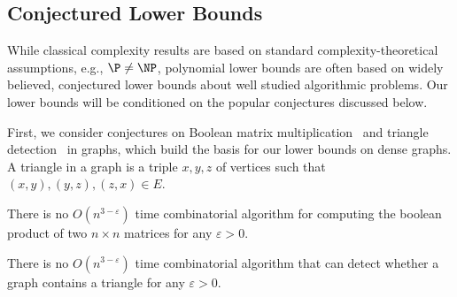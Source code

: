 \documentclass[11pt,letterpaper]{article}
\newcommand{\lu}{\textup{(}}
\newcommand{\ru}{\textup{)}\xspace}
\newcommand{\upbr}[1]{\lu #1\ru}
\newcommand{\target}{T\xspace}
\newif\iffullversion
\newcommand{\infull}[1]{\iffullversion #1\fi}
\begin{document}
\infull{
\begin{observation}\label{obs:ConjBuchiStreet}
	Conjunctive Büchi \upbr{resp.\ coBüchi} objectives are special instances of Streett objectives.
\end{observation}
\begin{proof}
	For Büchi let $L_i = V$ and $U_i = \target_i$, for coBüchi let $L_i = \target_i$
	and $U_i = \emptyset$.
\end{proof}

\begin{observation}\label{obs:DisjBuchiRabin}
	Disjunctive Büchi \upbr{resp.\ coBüchi} objectives are special instances of Rabin objectives.
\end{observation}
\begin{proof}
	For Büchi let $L_i = \target_i$ and $U_i = \emptyset$, for coBüchi let 
	$L_i = V$ and $U_i = \target_i$.
\end{proof}
}

\subsection{Conjectured Lower Bounds}\label{sec:conjectures}

While classical complexity results are based on standard complexity-theoretical assumptions,
e.g., $\P \ne \NP$, polynomial lower bounds are often based on widely believed,
conjectured lower bounds 
about well studied algorithmic problems.
Our lower bounds will be conditioned on the popular conjectures discussed below.

First, we consider conjectures on Boolean matrix multiplication~\cite{WilliamsW10,AbboudW14} and 
triangle detection~\cite{AbboudW14} in graphs, which build the basis for our lower bounds on dense graphs. A triangle in a graph is a triple $x, y, z$ of vertices 
such that $(x, y), (y, z), (z, x) \in E$.

\begin{conjecture}\label{conj:bmm}
There is no $O(n^{3 - \varepsilon})$ time combinatorial algorithm for computing the boolean product of 
two $n \times n$ matrices for any $\varepsilon > 0$.
\end{conjecture}

\begin{conjecture}\label{conj:triangle}
There is \infull{no $O(\min\{n^{\omega - \varepsilon},$ $m^{2 \omega/(\omega + 1) - \varepsilon}\})$ expected time algorithm and }no
$O(n^{3 - \varepsilon})$ time combinatorial algorithm that can detect whether a graph contains a triangle for any $\varepsilon > 0$\infull{, 
where $\omega < 2.373$ is the matrix multiplication exponent}. 
\end{conjecture}
\end{document}
